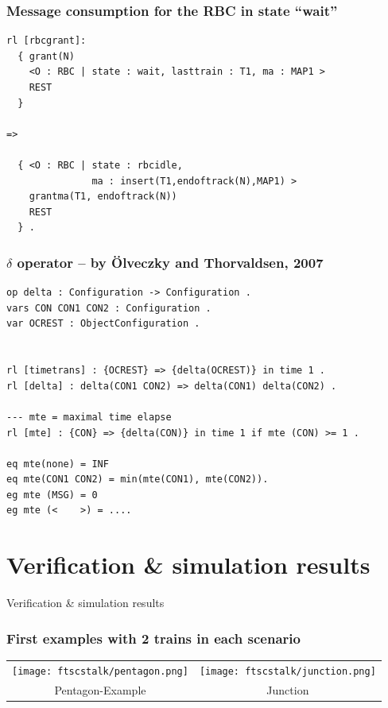 \documentclass{beamer}
\begin{document}
\begin{frame}[fragile]
\frametitle{Message consumption for the RBC in state ``wait''}
\begin{verbatim}
rl [rbcgrant]:
  { grant(N) 
    <O : RBC | state : wait, lasttrain : T1, ma : MAP1 > 
    REST
  } 

=>

  { <O : RBC | state : rbcidle, 
               ma : insert(T1,endoftrack(N),MAP1) >
    grantma(T1, endoftrack(N)) 
    REST
  } .
\end{verbatim}
\end{frame}




\begin{frame}[fragile]
\frametitle{$\delta$ operator -- by {\"O}lveczky and Thorvaldsen, 2007}

\begin{verbatim}
op delta : Configuration -> Configuration . 
vars CON CON1 CON2 : Configuration . 
var OCREST : ObjectConfiguration .


rl [timetrans] : {OCREST} => {delta(OCREST)} in time 1 .
rl [delta] : delta(CON1 CON2) => delta(CON1) delta(CON2) .

--- mte = maximal time elapse
rl [mte] : {CON} => {delta(CON)} in time 1 if mte (CON) >= 1 .  

eq mte(none) = INF 
eq mte(CON1 CON2) = min(mte(CON1), mte(CON2)).
eg mte (MSG) = 0
eg mte (<    >) = ....
\end{verbatim}
\end{frame}










\section{Verification \& simulation results}

\begin{frame}
\begin{center}
{\Large Verification \& simulation results}
\end{center}
\end{frame}


\begin{frame}
\frametitle{First examples with 2 trains in each scenario}

\begin{center}
\begin{tabular}{cc}
\texttt{[image: ftscstalk/pentagon.png]} &
\texttt{[image: ftscstalk/junction.png]} \\
Pentagon-Example & Junction
\end{tabular}
\end{center}

\end{frame}
\end{document}
